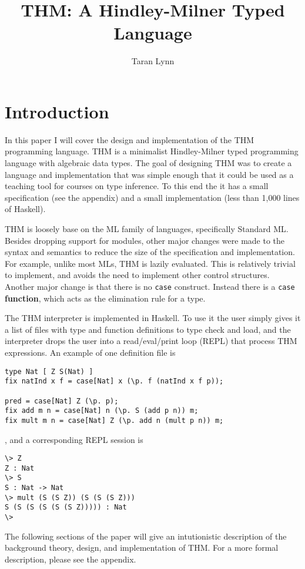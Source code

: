 \documentclass[12pt]{article}
\title{THM: A Hindley-Milner Typed Language}
\author{Taran Lynn}
\begin{document}
\maketitle


\section{Introduction}

In this paper I will cover the design and implementation of the THM
programming language.
THM is a minimalist Hindley-Milner typed programming language with
algebraic data types.
The goal of designing THM was to create a language and implementation
that was simple enough that it could be used as a teaching tool for
courses on type inference.
To this end the it has a small specification (see the appendix) and a
small implementation (less than 1,000 lines of Haskell).

THM is loosely base on the ML family of languages, specifically
Standard ML.
Besides dropping support for modules, other major changes were made to
the syntax and semantics to reduce the size of the specification and
implementation.
For example, unlike most MLs, THM is lazily evaluated.
This is relatively trivial to implement, and avoids the need to
implement other control structures.
Another major change is that there is no \verb~case~ construct.
Instead there is a \verb~case~ \textbf{function}, which acts as the
elimination rule for a type.

The THM interpreter is implemented in Haskell.
To use it the user simply gives it a list of files with type and
function definitions to type check and load, and the interpreter drops
the user into a read/eval/print loop (REPL) that process THM
expressions.
An example of one definition file is
\begin{verbatim}
type Nat [ Z S(Nat) ]
fix natInd x f = case[Nat] x (\p. f (natInd x f p));

pred = case[Nat] Z (\p. p);
fix add m n = case[Nat] n (\p. S (add p n)) m;
fix mult m n = case[Nat] Z (\p. add n (mult p n)) m;
\end{verbatim}
, and a corresponding REPL session is
\begin{verbatim}
\> Z
Z : Nat
\> S
S : Nat -> Nat
\> mult (S (S Z)) (S (S (S Z)))
S (S (S (S (S (S Z))))) : Nat
\>
\end{verbatim}

The following sections of the paper will give an intutionistic
description of the background theory, design, and implementation of
THM.
For a more formal description, please see the appendix.
\end{document}
